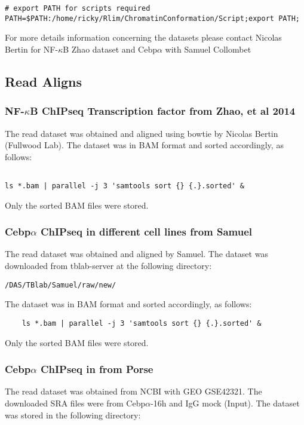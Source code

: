 \documentclass{article}\usepackage[]{graphicx}\usepackage[]{color}
\begin{document}
\begin{verbatim}
# export PATH for scripts required 
PATH=$PATH:/home/ricky/Rlim/ChromatinConformation/Script;export PATH;
\end{verbatim}

\small{For more details information concerning the datasets please contact Nicolas Bertin for NF-$\kappa$B Zhao dataset and Cebp$\alpha$ with Samuel Collombet}
\subsection{Read Aligns}

\subsubsection{NF-$\kappa$B ChIPseq Transcription factor from Zhao, et al 2014}
The read dataset was obtained and aligned using bowtie by Nicolas Bertin (Fullwood Lab).
The dataset was in BAM format and sorted accordingly, as follows: 

\begin{verbatim}

ls *.bam | parallel -j 3 'samtools sort {} {.}.sorted' & 

\end{verbatim}

Only the sorted BAM files were stored.


\subsubsection{Cebp$\alpha$ ChIPseq in different cell lines from Samuel}
The read dataset was obtained and aligned by Samuel.
The dataset was downloaded from tblab-server at the following directory:

\verb |/DAS/TBlab/Samuel/raw/new/| 

The dataset was in BAM format and sorted accordingly, as follows: 

\begin{verbatim}
    ls *.bam | parallel -j 3 'samtools sort {} {.}.sorted' & 
\end{verbatim}

Only the sorted BAM files were stored.

\subsubsection{Cebp$\alpha$ ChIPseq in from Porse}
The read dataset was obtained from NCBI with GEO GSE42321. 
The downloaded SRA files were from Cebp$\alpha$-16h and IgG mock (Input).
The dataset was stored in the following directory:
\end{document}
